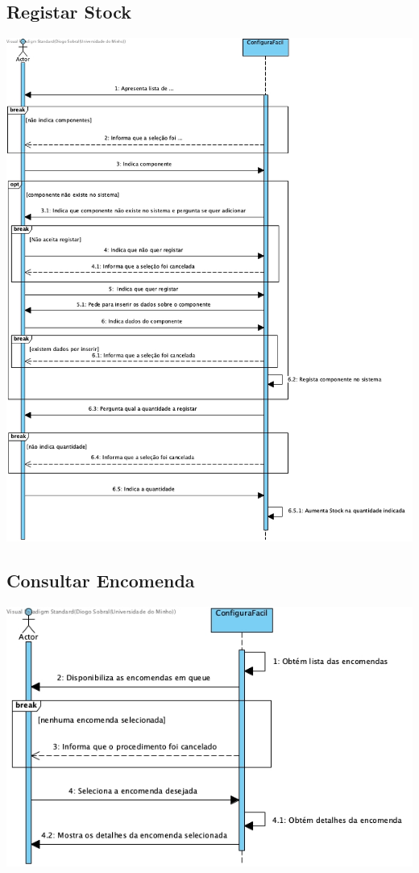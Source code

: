 \subsection{Registar Stock}
\begin{center}
 	\includegraphics[width = 5.5in]{DSS/DSS-Registar_Stock.jpg}
\end{center}

\subsection{Consultar Encomenda}
\begin{center}
 	\includegraphics[scale = 0.6]{DSS/DSS-Consultar_encomenda.jpg}
\end{center}


